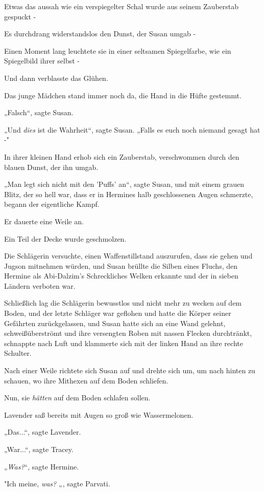 {Etwas das aussah wie ein verspiegelter Schal wurde aus seinem Zauberstab gespuckt -

Es durchdrang widerstandslos den Dunst, der Susan umgab -

Einen Moment lang leuchtete sie in einer seltsamen Spiegelfarbe, wie ein Spiegelbild ihrer selbst -

Und dann verblasste das Glühen.

Das junge Mädchen stand immer noch da, die Hand in die Hüfte gestemmt.

„Falsch“, sagte Susan.

„Und \emph{dies} ist die Wahrheit“, sagte Susan. „Falls es euch noch niemand gesagt hat -"

In ihrer kleinen Hand erhob sich ein Zauberstab, verschwommen durch den blauen Dunst, der ihn umgab.

„Man legt sich nicht mit den 'Puffs' an“, sagte Susan, und mit einem grauen Blitz, der so hell war, dass er in Hermines halb geschlossenen Augen schmerzte, begann der eigentliche Kampf.

Er dauerte eine Weile an.

Ein Teil der Decke wurde geschmolzen.

Die Schlägerin versuchte, einen Waffenstillstand auszurufen, dass sie gehen und Jugson mitnehmen würden, und Susan brüllte die Silben eines Fluchs, den Hermine als Abi-Dalzim's Schreckliches Welken erkannte und der in sieben Ländern verboten war.

Schließlich lag die Schlägerin bewusstlos und nicht mehr zu wecken auf dem Boden, und der letzte Schläger war geflohen und hatte die Körper seiner Gefährten zurückgelassen, und Susan hatte sich an eine Wand gelehnt, schweißüberströmt und ihre versengten Roben mit nassen Flecken durchtränkt, schnappte nach Luft und klammerte sich mit der linken Hand an ihre rechte Schulter.

Nach einer Weile richtete sich Susan auf und drehte sich um, um nach hinten zu schauen, wo ihre Mithexen auf dem Boden schliefen.

Nun, sie \emph{hätten} auf dem Boden schlafen sollen.

Lavender saß bereits mit Augen so groß wie Wassermelonen.

„Das...“, sagte Lavender.

„War...“, sagte Tracey.

„\emph{Was?}“, sagte Hermine.

"Ich meine, \emph{was?} „, sagte Parvati.

}

